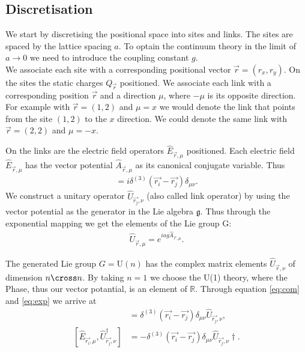 \section{}
\subsection{Discretisation}
We start by discretising the positional space into sites and links. The sites are spaced by the lattice spacing $a$. To optain the continuum theory in the limit of $a\rightarrow0$ we need to introduce the coupling constant $g$\cite{RevModPhys.51.659}.
\\
We associate each site with a corresponding positional vector $\vec{r}=(r_x, r_y)$. On the sites the static charges $Q_\vec{r}$ positioned. We associate each link with a corresponding position $\vec{r}$ and a direction $\mu$, where $-\mu$ is its opposite direction. For example with $\vec{r}=(1, 2)$ and $\mu=x$ we would denote the link that points from the site $(1, 2)$ to the $x$ direction. We could denote the same link with $\vec{r}=(2, 2)$ and $\mu=-x$.

On the links are the electric field operators $\hat{E}_{\vec{r},\mu}$ positioned. Each electric field $\hat{E}_{\vec{r}, \mu}$ has the vector potential $\hat{A}_{\vec{r}, \mu}$ as its canonical conjugate variable. Thus
\begin{align}
	[\hat{E}_{\vec{r_i}, \mu}, \hat{A}_{\vec{r_j}, \nu}]=i\delta^{(3)}(\vec{r_i}-\vec{r_j})\delta_{\mu\nu}.\label{eq:com}
\end{align}
We construct a unitary operator $\hat{U}_{\vec{r_j}, \nu}$ (also called link operator) by using the vector potential as the generator in the Lie algebra $\mathfrak{g}$. Thus through the exponential mapping we get the elements of the Lie group G:
\begin{align}
	\hat{U}_{\vec{r}, \mu} = e^{iag\hat{A}_{\vec{r}, \mu}}.\label{eq:exp}
\end{align}

The generated Lie group $G=\text{U}(n)$ has the complex matrix elements $\hat{U}_{\vec{r}, \nu}$ of dimension $n\cross n$. By taking $n=1$ we choose the U(1) theory, where the Phase, thus our vector potantial, is an element of $\mathbb{R}$. Through equation \ref{eq:com} and \ref{eq:exp} we arrive at
\begin{align}
	[\hat{E}_{\vec{r_i}, \mu}, \hat{U}_{\vec{r_j}, \nu}]      & =\delta^{(3)}(\vec{r_i}-\vec{r_j})\delta_{\mu\nu}\hat{U}_{\vec{r_j}, \nu},\label{eq:comu1}       \\
	[\hat{E}_{\vec{r_i}, \mu}, \hat{U}_{\vec{r_j}, \nu}^\dag] & =-\delta^{(3)}(\vec{r_i}-\vec{r_j})\delta_{\mu\nu}\hat{U}_{\vec{r_j}, \nu}\dag. \label{eq:comu2}
\end{align}

